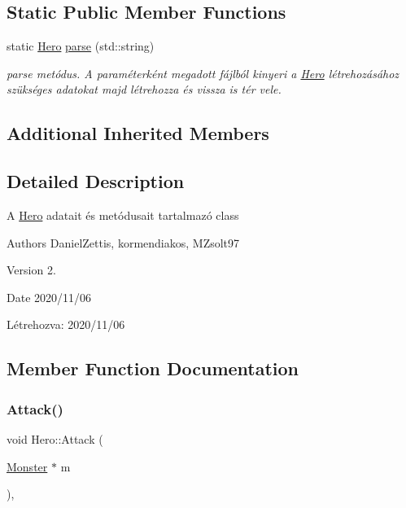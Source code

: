 \subsection*{Static Public Member Functions}
\begin{DoxyCompactItemize}
\item 
\mbox{\label{classHero_ae2281a5142355d85b799cc836cd90bcf}} 
static \hyperlink{classHero}{Hero} \hyperlink{classHero_ae2281a5142355d85b799cc836cd90bcf}{parse} (std\+::string)
\begin{DoxyCompactList}\small\item\em parse metódus. A paraméterként megadott fájlból kinyeri a \hyperlink{classHero}{Hero} létrehozásához szükséges adatokat majd létrehozza és vissza is tér vele. \end{DoxyCompactList}\end{DoxyCompactItemize}
\subsection*{Additional Inherited Members}


\subsection{Detailed Description}
A \hyperlink{classHero}{Hero} adatait és metódusait tartalmazó class

\begin{DoxyAuthor}{Authors}
Daniel\+Zettis, kormendiakos, M\+Zsolt97
\end{DoxyAuthor}
\begin{DoxyVersion}{Version}
2.
\end{DoxyVersion}
\begin{DoxyDate}{Date}
2020/11/06
\end{DoxyDate}
Létrehozva\+: 2020/11/06 

\subsection{Member Function Documentation}
\mbox{\label{classHero_a4c2c5bcf53b4fa4cb931d9930e3f0844}} 
\subsubsection{\texorpdfstring{Attack()}{Attack()}}
{\footnotesize\ttfamily void Hero\+::\+Attack (\begin{DoxyParamCaption}\item[{\hyperlink{classMonster}{Monster} $\ast$}]{m }\end{DoxyParamCaption})\hspace{0.3cm}{\ttfamily [override]}, {\ttfamily [virtual]}}




